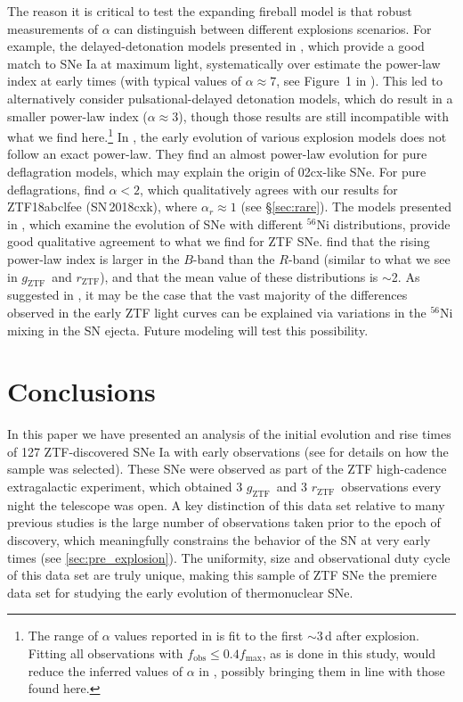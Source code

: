\documentclass[twocolumn]{aastex63}
\newcommand{\rztf}{$r_\mathrm{ZTF}$}
\newcommand{\gztf}{$g_\mathrm{ZTF}$}
\begin{document}
The reason it is critical to test the expanding fireball model is that robust
measurements of $\alpha$ can distinguish between different explosions
scenarios. For example, the delayed-detonation models presented in
\citet{Blondin13}, which provide a good match to SNe Ia at maximum light,
systematically over estimate the power-law index at early times (with typical
values of $\alpha \approx 7$, see Figure~1 in \citealt{Dessart14}). This led
\citet{Dessart14} to alternatively consider pulsational-delayed detonation
models, which do result in a smaller power-law index ($\alpha \approx 3$),
though those results are still incompatible with what we find
here.\footnote{The range of $\alpha$ values reported in \citet{Dessart14} is
fit to the first $\sim$3\,d after explosion. Fitting all observations with
$f_\mathrm{obs} \leq 0.4 f_\mathrm{max}$, as is done in this study, would
reduce the inferred values of $\alpha$ in \citet{Dessart14}, possibly bringing
them in line with those found here.} In \citet{Noebauer17}, the early
evolution of various explosion models does not follow an exact power-law. They
find an almost power-law evolution for pure deflagration models, which may
explain the origin of 02cx-like SNe. For pure deflagrations,
\citet{Noebauer17} find $\alpha < 2$, which qualitatively agrees with our
results for ZTF18abclfee (SN\,2018cxk), where $\alpha_r \approx 1$ (see
\S\ref{sec:rare}). The models presented in \citet{Magee19}, which examine the
evolution of SNe with different $^{56}$Ni distributions, provide good
qualitative agreement to what we find for ZTF SNe. \citet{Magee19} find that
the rising power-law index is larger in the $B$-band than the $R$-band
(similar to what we see in \gztf\ and \rztf), and that the mean value of these
distributions is $\sim$2. As suggested in \citet{Magee19}, it may be the case
that the vast majority of the differences observed in the early ZTF light
curves can be explained via variations in the $^{56}$Ni mixing in the SN
ejecta. Future modeling will test this possibility.


\section{Conclusions}

In this paper we have presented an analysis of the initial evolution and rise
times of 127 ZTF-discovered SNe Ia with early observations (see
\citealt{Yao19} for details on how the sample was selected). These SNe were
observed as part of the ZTF high-cadence extragalactic experiment, which
obtained 3 \gztf\ and 3 \rztf\ observations every night the telescope was
open. A key distinction of this data set relative to many previous studies is
the large number of observations taken prior to the epoch of discovery, which
meaningfully constrains the behavior of the SN at very early times (see
\ref{sec:pre_explosion}). The uniformity, size and observational duty cycle of
this data set are truly unique, making this sample of ZTF SNe the premiere
data set for studying the early evolution of thermonuclear SNe.
\end{document}

